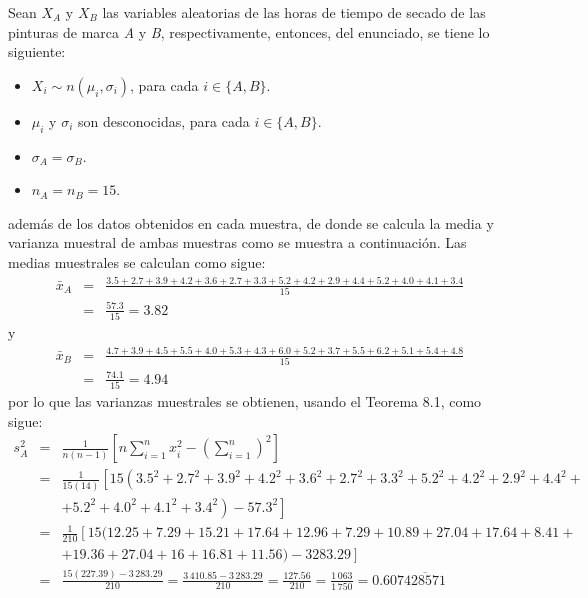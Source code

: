 \begin{solucion}
 Sean $X_A$ y $X_B$ las variables aleatorias de las horas de tiempo de secado de las pinturas de marca \textit{A} y \textit{B}, respectivamente, entonces, del enunciado, se tiene lo siguiente:
 \begin{itemize}
  \item $X_i \sim n\left( \mu_i, \sigma_i  \right)$, para cada $i \in \{ A, B \}$.
  \item $\mu_i$ y $\sigma_i$ son desconocidas, para cada $i \in \{ A, B \}$.
  \item $\sigma_A = \sigma_B$.
  \item $n_A = n_B = 15$.
 \end{itemize}
 adem\'as de los datos obtenidos en cada muestra, de donde se calcula la media y varianza muestral de ambas muestras como se muestra a continuaci\'on. Las medias muestrales se calculan como sigue:
 \begin{eqnarray*}
  \bar{x}_A & = & \frac{3.5 + 2.7 + 3.9 + 4.2 + 3.6 + 2.7 + 3.3 + 5.2 + 4.2 + 2.9 + 4.4 + 5.2 + 4.0 + 4.1 + 3.4}{15} \\
  & = & \frac{57.3}{15} = 3.82
 \end{eqnarray*}
 y
 \begin{eqnarray*}
  \bar{x}_B & = & \frac{4.7 + 3.9 + 4.5 + 5.5 + 4.0 + 5.3 + 4.3 + 6.0 + 5.2 + 3.7 + 5.5 + 6.2 + 5.1 + 5.4 + 4.8}{15} \\
  & = & \frac{74.1}{15} = 4.94
 \end{eqnarray*}
 por lo que las varianzas muestrales se obtienen, usando el Teorema 8.1, como sigue:
 \begin{eqnarray*}
  s_A^2 & = & \frac{1}{n(n-1)} \left[ n\sum_{i=1}^n x_i^2 - \left( \sum_{i=1}^n \right)^2 \right] \\
  & = & \frac{1}{15(14)} \left[ 15\left( 3.5^2 + 2.7^2 + 3.9^2 + 4.2^2 + 3.6^2 + 2.7^2 + 3.3^2 + 5.2^2 + 4.2^2 + 2.9^2 + 4.4^2 + \right. \right. \\
  & & \left. \left. + 5.2^2 + 4.0^2 + 4.1^2 + 3.4^2 \right) - 57.3^2 \right] \\
  & = & \frac{1}{210}\left[ 15 (12.25 + 7.29 + 15.21 + 17.64 + 12.96 + 7.29 + 10.89 + 27.04 + 17.64 + 8.41 + \right.  \\
  & & \left. + 19.36 + 27.04 + 16 + 16.81 + 11.56) - 3283.29 \right] \\
  & = & \frac{15(227.39) - 3\,283.29}{210} = \frac{3\,410.85 - 3\,283.29}{210} = \frac{127.56}{210} = \frac{1\,063}{1\,750} = 0.607\overline{428571}
 \end{eqnarray*}

\end{solucion}
